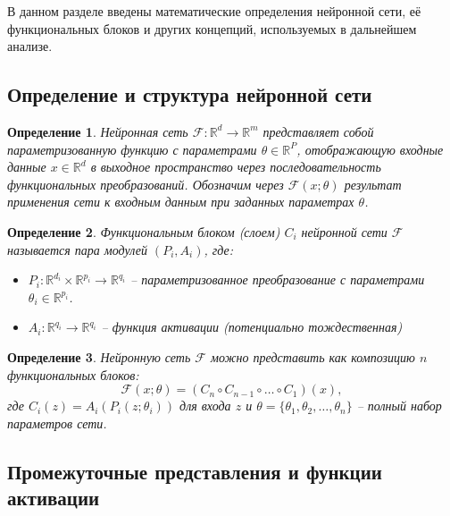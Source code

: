 \documentclass[a4paper,12pt]{article}
\newtheorem{definition}{Определение}
\begin{document}
В данном разделе введены математические определения нейронной сети, её функциональных блоков и других концепций, используемых в дальнейшем анализе.

\subsection{Определение и структура нейронной сети}

\begin{definition}
Нейронная сеть $\mathcal{F}: \mathbb{R}^d \rightarrow \mathbb{R}^m$ представляет собой параметризованную функцию с параметрами $\theta \in \mathbb{R}^P$, отображающую входные данные $x \in \mathbb{R}^d$ в выходное пространство через последовательность функциональных преобразований. Обозначим через $\mathcal{F}(x; \theta)$ результат применения сети к входным данным при заданных параметрах $\theta$.
\end{definition}

\begin{definition}
Функциональным блоком (слоем) $C_i$ нейронной сети $\mathcal{F}$ называется пара модулей $(P_i, A_i)$, где:
\begin{itemize}
\item $P_i: \mathbb{R}^{d_i} \times \mathbb{R}^{p_i} \rightarrow \mathbb{R}^{q_i}$ -- параметризованное преобразование с параметрами $\theta_i \in \mathbb{R}^{p_i}$.
\item $A_i: \mathbb{R}^{q_i} \rightarrow \mathbb{R}^{q_i}$ -- функция активации (потенциально тождественная)
\end{itemize}
\end{definition}

\begin{definition}
Нейронную сеть $\mathcal{F}$ можно представить как композицию $n$ функциональных блоков:
\begin{equation}
    \mathcal{F}(x; \theta) = (C_n \circ C_{n-1} \circ \ldots \circ C_1)(x),
\end{equation}
где $C_i(z) = A_i(P_i(z; \theta_i))$ для входа $z$ и $\theta = \{\theta_1, \theta_2, \ldots, \theta_n\}$ -- полный набор параметров сети.
\end{definition}

\subsection{Промежуточные представления и функции активации}
\end{document}
